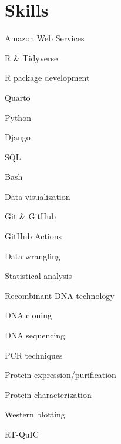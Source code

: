 \documentclass{resume}
\begin{document}
    \section{Skills}

        \begin{skills}
            \item Amazon Web Services
            \item R \& Tidyverse
            \item R package development
            \item Quarto
            \item Python
            \item Django
            \item SQL
            \item Bash
            \item Data visualization
            \item Git \& GitHub
            \item GitHub Actions
            \item Data wrangling
            \item Statistical analysis

            \item Recombinant DNA technology
            \item DNA cloning
            \item DNA sequencing
            \item PCR techniques
            \item Protein expression/purification
            \item Protein characterization
            \item Western blotting
            \item RT-QuIC


\end{skills}
\end{document}
